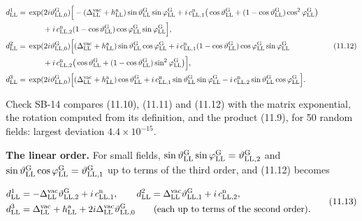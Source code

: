 \documentclass[
  10pt,
]{article}
\begin{document}
\[\begin{aligned}d^1_{\rm LL}={}&\exp(2i\vartheta^{\rm G}_{{\rm LL},0})\Big[-(\Delta^{\rm vac}_{\rm LL}+h^{\rm a}_{\rm LL})\sin\vartheta^{\rm G}_{\rm LL}\sin\varphi^{\rm G}_{\rm LL}+i\,c^{\rm n}_{{\rm LL},1}\big(\cos\vartheta^{\rm G}_{\rm LL}+(1-\cos\vartheta^{\rm G}_{\rm LL})\cos^2\varphi^{\rm G}_{\rm LL}\big)\\&\qquad+i\,c^{\rm n}_{{\rm LL},2}(1-\cos\vartheta^{\rm G}_{\rm LL})\cos\varphi^{\rm G}_{\rm LL}\sin\varphi^{\rm G}_{\rm LL}\Big],\\d^2_{\rm LL}={}&\exp(2i\vartheta^{\rm G}_{{\rm LL},0})\Big[(\Delta^{\rm vac}_{\rm LL}+h^{\rm a}_{\rm LL})\sin\vartheta^{\rm G}_{\rm LL}\cos\varphi^{\rm G}_{\rm LL}+i\,c^{\rm n}_{{\rm LL},1}(1-\cos\vartheta^{\rm G}_{\rm LL})\cos\varphi^{\rm G}_{\rm LL}\sin\varphi^{\rm G}_{\rm LL}\\&\qquad+i\,c^{\rm n}_{{\rm LL},2}\big(\cos\vartheta^{\rm G}_{\rm LL}+(1-\cos\vartheta^{\rm G}_{\rm LL})\sin^2\varphi^{\rm G}_{\rm LL}\big)\Big],\\d^3_{\rm LL}={}&\exp(2i\vartheta^{\rm G}_{{\rm LL},0})\Big[(\Delta^{\rm vac}_{\rm LL}+h^{\rm a}_{\rm LL})\cos\vartheta^{\rm G}_{\rm LL}+i\,c^{\rm n}_{{\rm LL},1}\sin\vartheta^{\rm G}_{\rm LL}\sin\varphi^{\rm G}_{\rm LL}-i\,c^{\rm n}_{{\rm LL},2}\sin\vartheta^{\rm G}_{\rm LL}\cos\varphi^{\rm G}_{\rm LL}\Big].\end{aligned}\tag{11.12}\]

Check SB-14 compares (11.10), (11.11) and (11.12) with the matrix
exponential, the rotation computed from its definition, and the product
(11.9), for 50 random fields: largest deviation \(4.4\times10^{-15}\).

\textbf{The linear order.} For small fields,
\(\sin\vartheta^{\rm G}_{\rm LL}\sin\varphi^{\rm G}_{\rm LL}=\vartheta^{\rm G}_{{\rm LL},2}\)
and
\(\sin\vartheta^{\rm G}_{\rm LL}\cos\varphi^{\rm G}_{\rm LL}=\vartheta^{\rm G}_{{\rm LL},1}\)
up to terms of the third order, and (11.12) becomes

\[\begin{aligned}d^1_{\rm LL}&=-\Delta^{\rm vac}_{\rm LL}\vartheta^{\rm G}_{{\rm LL},2}+i\,c^{\rm n}_{{\rm LL},1},\qquad d^2_{\rm LL}=\Delta^{\rm vac}_{\rm LL}\vartheta^{\rm G}_{{\rm LL},1}+i\,c^{\rm n}_{{\rm LL},2},\\d^3_{\rm LL}&=\Delta^{\rm vac}_{\rm LL}+h^{\rm a}_{\rm LL}+2i\Delta^{\rm vac}_{\rm LL}\vartheta^{\rm G}_{{\rm LL},0}\qquad\text{(each up to terms of the second order)}.\end{aligned}\tag{11.13}\]
\end{document}
